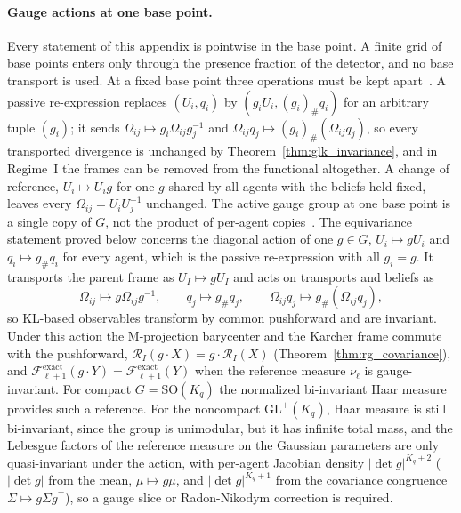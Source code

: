 \documentclass[11pt]{article}
\begin{document}
\paragraph{Gauge actions at one base point.}
Every statement of this appendix is pointwise in the base point. A finite grid of base points enters only through the presence fraction of the detector, and no base transport is used. At a fixed base point three operations must be kept apart~\cite[Ch.~2]{DennisGaugeVFE2026}. A passive re-expression replaces $(U_i,q_i)$ by $(g_iU_i,(g_i)_\#q_i)$ for an arbitrary tuple $(g_i)$; it sends $\Omega_{ij}\mapsto g_i\Omega_{ij}g_j^{-1}$ and $\Omega_{ij}q_j\mapsto(g_i)_\#(\Omega_{ij}q_j)$, so every transported divergence is unchanged by Theorem~\ref{thm:glk_invariance}, and in Regime~I the frames can be removed from the functional altogether. A change of reference, $U_i\mapsto U_ig$ for one $g$ shared by all agents with the beliefs held fixed, leaves every $\Omega_{ij}=U_iU_j^{-1}$ unchanged. The active gauge group at one base point is a single copy of $G$, not the product of per-agent copies~\cite[Ch.~2]{DennisGaugeVFE2026}. The equivariance statement proved below concerns the diagonal action of one $g\in G$, $U_i\mapsto gU_i$ and $q_i\mapsto g_\#q_i$ for every agent, which is the passive re-expression with all $g_i=g$. It transports the parent frame as $U_I\mapsto gU_I$ and acts on transports and beliefs as
\begin{equation}
\Omega_{ij} \mapsto g \Omega_{ij} g^{-1}, \qquad q_j \mapsto g_\# q_j, \qquad \Omega_{ij} q_j \mapsto g_\#(\Omega_{ij} q_j),
\end{equation}
so KL-based observables transform by common pushforward and are invariant. Under this action the M-projection barycenter and the Karcher frame commute with the pushforward, $\mathcal{R}_I(g \cdot X) = g \cdot \mathcal{R}_I(X)$ (Theorem~\ref{thm:rg_covariance}), and $\mathcal{F}^{\mathrm{exact}}_{\ell+1}(g \cdot Y) = \mathcal{F}^{\mathrm{exact}}_{\ell+1}(Y)$ when the reference measure $\nu_\ell$ is gauge-invariant. For compact $G = \mathrm{SO}(K_q)$ the normalized bi-invariant Haar measure provides such a reference. For the noncompact $\mathrm{GL}^+(K_q)$, Haar measure is still bi-invariant, since the group is unimodular, but it has infinite total mass, and the Lebesgue factors of the reference measure on the Gaussian parameters are only quasi-invariant under the action, with per-agent Jacobian density $|\det g|^{K_q+2}$ ($|\det g|$ from the mean, $\mu \mapsto g\mu$, and $|\det g|^{K_q+1}$ from the covariance congruence $\Sigma \mapsto g\Sigma g^\top$), so a gauge slice or Radon-Nikodym correction is required.
\end{document}
